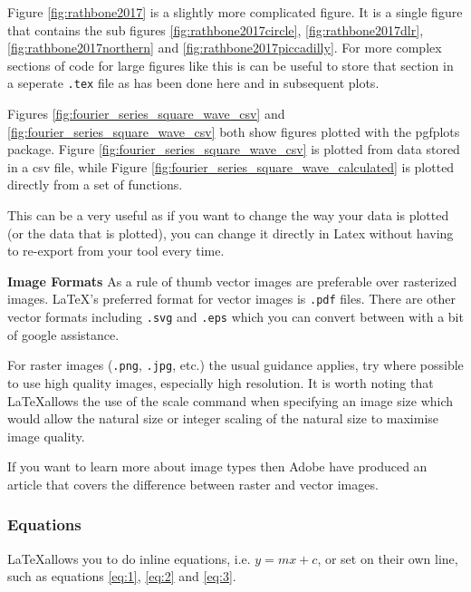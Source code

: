 Figure \ref{fig:rathbone2017} is a slightly more complicated figure. It is a single figure that contains the sub figures \ref{fig:rathbone2017circle}, \ref{fig:rathbone2017dlr}, \ref{fig:rathbone2017northern} and \ref{fig:rathbone2017piccadilly}. For more complex sections of code for large figures like this is can be useful to store that section in a seperate \verb|.tex| file as has been done here and in subsequent plots.





Figures \ref{fig:fourier_series_square_wave_csv} and \ref{fig:fourier_series_square_wave_csv} both show figures plotted with the pgfplots package. Figure \ref{fig:fourier_series_square_wave_csv} is plotted from data stored in a csv file, while Figure \ref{fig:fourier_series_square_wave_calculated} is plotted directly from a set of functions. 

This can be a very useful as if you want to change the way your data is plotted (or the data that is plotted), you can change it directly in Latex without having to re-export from your tool every time.

\textbf{Image Formats}
As a rule of thumb vector images are preferable over rasterized images. \LaTeX's preferred format for vector images is \verb|.pdf| files. There are other vector formats including \verb|.svg| and \verb|.eps| which you can convert between with a bit of google assistance.

For raster images (\verb|.png|, \verb|.jpg|, etc.) the usual guidance applies, try where possible to use high quality images, especially high resolution. It is worth noting that \LaTeX allows the use of the scale command when specifying an image size which would allow the natural size or integer scaling of the natural size to maximise image quality.

If you want to learn more about image types then Adobe have produced an article that covers the difference between raster and vector images\cite{adobe-raster-vector}.


\subsubsection{Equations}
\LaTeX allows you to do inline equations, i.e. $y=mx+c$, or set on their own line, such as equations \ref{eq:1}, \ref{eq:2} and \ref{eq:3}.

